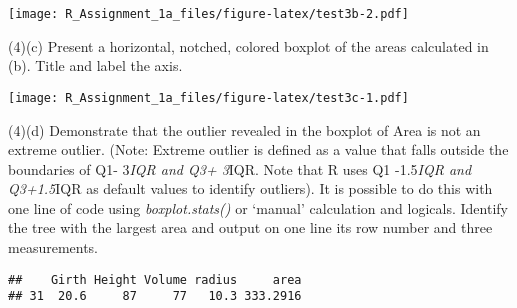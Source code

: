 \documentclass[
]{article}
\newenvironment{Shaded}{\begin{snugshade}}{\end{snugshade}}
\newcommand{\AttributeTok}[1]{\textcolor[rgb]{0.77,0.63,0.00}{#1}}
\newcommand{\CommentTok}[1]{\textcolor[rgb]{0.56,0.35,0.01}{\textit{#1}}}
\newcommand{\ConstantTok}[1]{\textcolor[rgb]{0.00,0.00,0.00}{#1}}
\newcommand{\FunctionTok}[1]{\textcolor[rgb]{0.00,0.00,0.00}{#1}}
\newcommand{\NormalTok}[1]{#1}
\newcommand{\OtherTok}[1]{\textcolor[rgb]{0.56,0.35,0.01}{#1}}
\newcommand{\SpecialCharTok}[1]{\textcolor[rgb]{0.00,0.00,0.00}{#1}}
\newcommand{\StringTok}[1]{\textcolor[rgb]{0.31,0.60,0.02}{#1}}
\begin{document}
\texttt{[image: R\_Assignment\_1a\_files/figure-latex/test3b-2.pdf]}

(4)(c) Present a horizontal, notched, colored boxplot of the areas
calculated in (b). Title and label the axis.

\begin{Shaded}
\end{Shaded}

\texttt{[image: R\_Assignment\_1a\_files/figure-latex/test3c-1.pdf]}

(4)(d) Demonstrate that the outlier revealed in the boxplot of Area is
not an extreme outlier. (Note: Extreme outlier is defined as a value
that falls outside the boundaries of Q1- 3\emph{IQR and Q3+ 3}IQR. Note
that R uses Q1 -1.5\emph{IQR and Q3+1.5}IQR as default values to
identify outliers). It is possible to do this with one line of code
using \emph{boxplot.stats()} or `manual' calculation and logicals.
Identify the tree with the largest area and output on one line its row
number and three measurements.

\begin{Shaded}
\end{Shaded}

\begin{verbatim}
##    Girth Height Volume radius     area
## 31  20.6     87     77   10.3 333.2916
\end{verbatim}

\begin{Shaded}
\end{Shaded}
\end{document}
